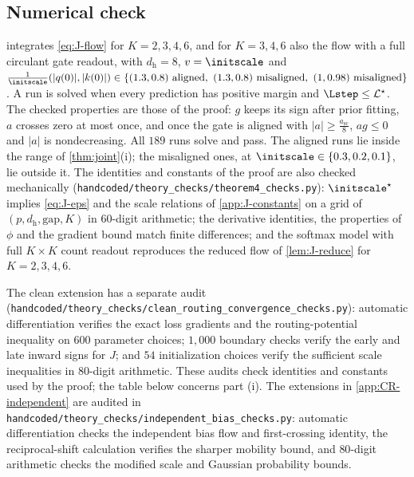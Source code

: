 \subsection{Numerical check}
\label{app:J-generalK}

 integrates \cref{eq:J-flow} for $K=2,3,4,6$, and for $K=3,4,6$ also the flow with a full circulant gate readout, with
$d_{\mathrm h}=8$, $v=\initscale$ and $\frac{1}{\initscale}(|q(0)|,|k(0)|)\in\{(1.3,0.8)\text{ aligned},\ (1.3,0.8)\text{ misaligned},\ (1,0.98)\text{ misaligned}\}$. A run is solved when every
prediction has positive margin and $\Lstep\le \mathcal L^\star$. The checked properties are those of the proof: $g$ keeps its sign after prior
fitting, $a$ crosses zero at most once, and once the gate is aligned with $|a|\ge\frac{a_{\mathrm{sc}}}{8}$, $ag\le0$ and $|a|$ is nondecreasing. All $189$ runs
solve and pass. The aligned runs lie inside the range of \cref{thm:joint}(i); the misaligned ones, at $\initscale\in\{0.3,0.2,0.1\}$, lie outside it.
The identities and constants of the proof are also checked mechanically (\texttt{handcoded/theory\_checks/theorem4\_checks.py}): $\initscale^\star$
implies \cref{eq:J-eps} and the scale relations of \cref{app:J-constants} on a grid of $(p,d_{\mathrm h},\mathrm{gap},K)$ in $60$-digit arithmetic; the
derivative identities, the properties of $\phi$ and the gradient bound match finite differences; and the softmax model with full
$K\times K$ count readout reproduces the reduced flow of \cref{lem:J-reduce} for $K=2,3,4,6$.

The clean extension has a separate audit (\nolinkurl{handcoded/theory_checks/clean_routing_convergence_checks.py}):
automatic differentiation verifies the exact loss gradients and the routing-potential inequality on $600$ parameter choices;
$1{,}000$ boundary checks verify the early and late inward signs for $J$; and $54$ initialization choices verify the sufficient
scale inequalities in $80$-digit arithmetic. These audits check identities and constants used by the proof; the table below concerns part (i).
The extensions in \cref{app:CR-independent} are audited in
\nolinkurl{handcoded/theory_checks/independent_bias_checks.py}: automatic differentiation checks the independent bias flow
and first-crossing identity, the reciprocal-shift calculation verifies the sharper mobility bound, and $80$-digit arithmetic
checks the modified scale and Gaussian probability bounds.

